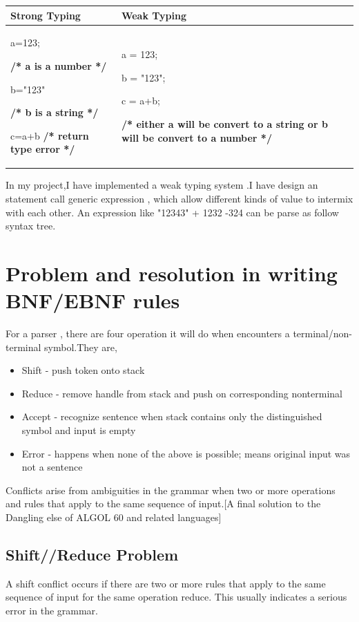 \begin{tabular}{p{6cm}|p{6cm}}
\hline Strong Typing & Weak Typing  \\ 
\hline a=123; \par 
\textbf{/* a is a number */} \par 
b="123" \par  
\textbf{/* b is a string */} \par 
c=a+b \textbf{/* return type error */}  &  
a = 123; \par 
b = "123"; \par
c = a+b; \par 
\textbf{/* either a will be convert to a string or b will be convert to a number */}

\\ 
\hline 
\end{tabular} 

In my project,I have implemented a weak typing system .I have design an statement call generic expression , which allow different kinds of value to intermix with each other. An expression like "12343" + 1232 -324 can be parse as follow syntax tree.




\section{Problem and resolution in writing BNF/EBNF rules}


For a parser , there are four operation it will do when encounters a terminal/non-terminal symbol.They are,
\begin{itemize}
\item Shift - push token onto stack
\item Reduce - remove handle from stack and push on corresponding nonterminal
\item Accept - recognize sentence when stack contains only the distinguished symbol and input is empty
\item Error - happens when none of the above is possible; means original input was not a sentence
\end{itemize}

Conflicts arise from ambiguities in the grammar when two or more operations and rules that apply to the same sequence of input.[A final solution to the Dangling else of ALGOL 60 and related languages]
\subsection{Shift//Reduce Problem}
A shift conflict occurs if there are two or more rules that
apply to the same sequence of input for the same operation reduce.  This usually indicates a serious
error in the grammar.

